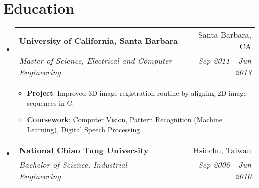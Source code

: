 \documentclass[letterpaper,12pt]{article}
\makeatletter
\newcommand{\resumeItem}[2]{
  \item\small{
    \textbf{#1}{: #2 \vspace{-2pt}}
  }
}
\newcommand{\resumeSubheading}[4]{
  \vspace{-1pt}\item
    \begin{tabular*}{0.97\textwidth}{l@{\extracolsep{\fill}}r}
      \textbf{#1} & #2 \\
      \textit{\small#3} & \textit{\small #4} \\
    \end{tabular*}\vspace{-5pt}
}
\newcommand{\resumeSubHeadingListStart}{\begin{itemize}[leftmargin=*]}
\newcommand{\resumeSubHeadingListEnd}{\end{itemize}}
\newcommand{\resumeItemListStart}{\begin{itemize}}
\newcommand{\resumeItemListEnd}{\end{itemize}\vspace{-5pt}}
\makeatother
\begin{document}
\section{Education}
  \resumeSubHeadingListStart
    \resumeSubheading
      {University of California, Santa Barbara}{Santa Barbara, CA}
      {Master of Science, Electrical and Computer Engineering}{Sep 2011 - Jun 2013}
    \resumeItemListStart
        \resumeItem{Project}
          {Improved 3D image registration routine by aligning 2D image sequences in C.}
        \resumeItem{Coursework}
          {Computer Vision, Pattern Recognition (Machine Learning), Digital Speech Processing}
     \resumeItemListEnd
    \resumeSubheading
      {National Chiao Tung University}{Hsinchu, Taiwan}
      {Bachelor of Science, Industrial Engineering}{Sep 2006 - Jun 2010}
  \resumeSubHeadingListEnd
\end{document}
